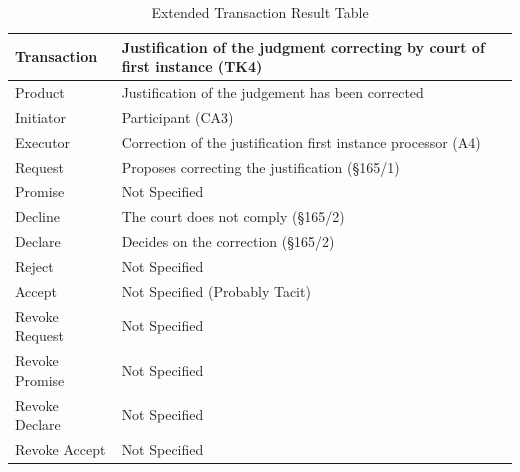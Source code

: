 \begin{landscape}
\begin{table}[h]
\caption{Extended Transaction Result Table}
\label{tab:etrt}
\begin{tabular}{|l||l|l|}
\hline
Transaction  &  Justification of the judgment correcting by court of first instance (TK4) \\ \hline
Product      & Justification of the judgement has been corrected \\ \hline
Initiator      &  Participant (CA3) \\ \hline
Executor       &  Correction of the justification first instance processor  (A4)      \\ \hline
Request        &  Proposes correcting the justification (\S165/1)   \\ \hline
Promise        &  Not Specified  \\ \hline
Decline        &  The court does not comply (\S165/2)  \\ \hline
Declare        &  Decides on the correction (\S165/2) \\ \hline
Reject         &  Not Specified   \\ \hline
Accept         &  Not Specified (Probably Tacit) \\ \hline
Revoke Request &  Not Specified        \\ \hline
Revoke Promise & Not Specified     \\ \hline
Revoke Declare & Not Specified       \\ \hline
Revoke Accept  &  Not Specified     \\ \hline
\end{tabular}
\end{table}


\end{landscape}
